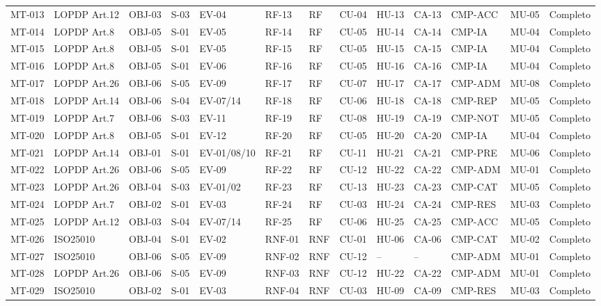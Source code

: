 \documentclass[12pt,journal,onecolumn]{IEEEtran}
\begin{document}
\begin{landscape}
\begin{longtable}{P{0.9cm}P{1.5cm}P{0.8cm}P{0.8cm}P{1.3cm}P{0.9cm}P{0.7cm}P{0.8cm}P{0.8cm}P{0.8cm}P{1.1cm}P{0.9cm}P{1.0cm}}
MT-013 & LOPDP Art.12 & OBJ-03 & S-03 & EV-04 & RF-13 & RF & CU-04 & HU-13 & CA-13 & CMP-ACC & MU-05 & Completo\\
MT-014 & LOPDP Art.8 & OBJ-05 & S-01 & EV-05 & RF-14 & RF & CU-05 & HU-14 & CA-14 & CMP-IA & MU-04 & Completo\\
MT-015 & LOPDP Art.8 & OBJ-05 & S-01 & EV-05 & RF-15 & RF & CU-05 & HU-15 & CA-15 & CMP-IA & MU-04 & Completo\\
MT-016 & LOPDP Art.8 & OBJ-05 & S-01 & EV-06 & RF-16 & RF & CU-05 & HU-16 & CA-16 & CMP-IA & MU-04 & Completo\\
MT-017 & LOPDP Art.26 & OBJ-06 & S-05 & EV-09 & RF-17 & RF & CU-07 & HU-17 & CA-17 & CMP-ADM & MU-08 & Completo\\
MT-018 & LOPDP Art.14 & OBJ-06 & S-04 & EV-07/14 & RF-18 & RF & CU-06 & HU-18 & CA-18 & CMP-REP & MU-05 & Completo\\
MT-019 & LOPDP Art.7 & OBJ-06 & S-03 & EV-11 & RF-19 & RF & CU-08 & HU-19 & CA-19 & CMP-NOT & MU-05 & Completo\\
MT-020 & LOPDP Art.8 & OBJ-05 & S-01 & EV-12 & RF-20 & RF & CU-05 & HU-20 & CA-20 & CMP-IA & MU-04 & Completo\\
MT-021 & LOPDP Art.14 & OBJ-01 & S-01 & EV-01/08/10 & RF-21 & RF & CU-11 & HU-21 & CA-21 & CMP-PRE & MU-06 & Completo\\
MT-022 & LOPDP Art.26 & OBJ-06 & S-05 & EV-09 & RF-22 & RF & CU-12 & HU-22 & CA-22 & CMP-ADM & MU-01 & Completo\\
MT-023 & LOPDP Art.26 & OBJ-04 & S-03 & EV-01/02 & RF-23 & RF & CU-13 & HU-23 & CA-23 & CMP-CAT & MU-05 & Completo\\
MT-024 & LOPDP Art.7 & OBJ-02 & S-01 & EV-03 & RF-24 & RF & CU-03 & HU-24 & CA-24 & CMP-RES & MU-03 & Completo\\
MT-025 & LOPDP Art.12 & OBJ-03 & S-04 & EV-07/14 & RF-25 & RF & CU-06 & HU-25 & CA-25 & CMP-ACC & MU-05 & Completo\\
MT-026 & ISO25010 & OBJ-04 & S-01 & EV-02 & RNF-01 & RNF & CU-01 & HU-06 & CA-06 & CMP-CAT & MU-02 & Completo\\
MT-027 & ISO25010 & OBJ-06 & S-05 & EV-09 & RNF-02 & RNF & CU-12 & -- & -- & CMP-ADM & MU-01 & Completo\\
MT-028 & LOPDP Art.26 & OBJ-06 & S-05 & EV-09 & RNF-03 & RNF & CU-12 & HU-22 & CA-22 & CMP-ADM & MU-01 & Completo\\
MT-029 & ISO25010 & OBJ-02 & S-01 & EV-03 & RNF-04 & RNF & CU-03 & HU-09 & CA-09 & CMP-RES & MU-03 & Completo\\

\end{longtable}
\end{landscape}
\end{document}
